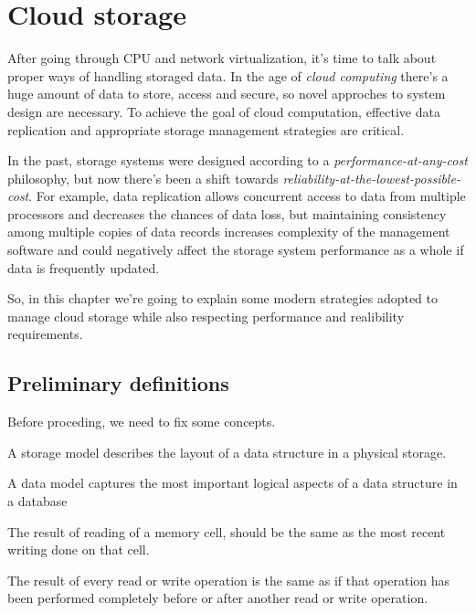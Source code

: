 \chapter{Cloud storage}
After going through CPU and network virtualization, it's time to talk about
proper ways of handling storaged data. In the age of \emph{cloud computing}
there's a huge amount of data to store, access and secure, so novel approches
to system design are necessary. To achieve the goal of cloud computation,
effective data replication and appropriate storage management strategies are
critical.

In the past, storage systems were designed according to a
\emph{performance-at-any-cost} philosophy, but now there's been a shift towards
\emph{reliability-at-the-lowest-possible-cost}. For example, data replication
allows concurrent access to data from multiple processors and decreases the
chances of data loss, but maintaining consistency among multiple copies of data
records increases complexity of the management software and could negatively
affect the storage system performance as a whole if data is frequently updated.

So, in this chapter we're going to explain some modern strategies adopted
to manage cloud storage while also respecting performance and realibility
requirements.

\section{Preliminary definitions}
Before proceding, we need to fix some concepts.

\begin{definition}
    A storage model describes the layout of a data structure in a physical storage.
\end{definition}
\begin{definition}
    A data model captures the most important logical aspects of a data structure
    in a database
\end{definition}

\begin{definition}
    The result of reading of a memory cell, should be the same as the most recent
    writing done on that cell.
\end{definition}
\begin{definition}
    The result of every read or write operation is the same as if that
    operation has been performed completely before or after another read or
    write operation.
\end{definition}

